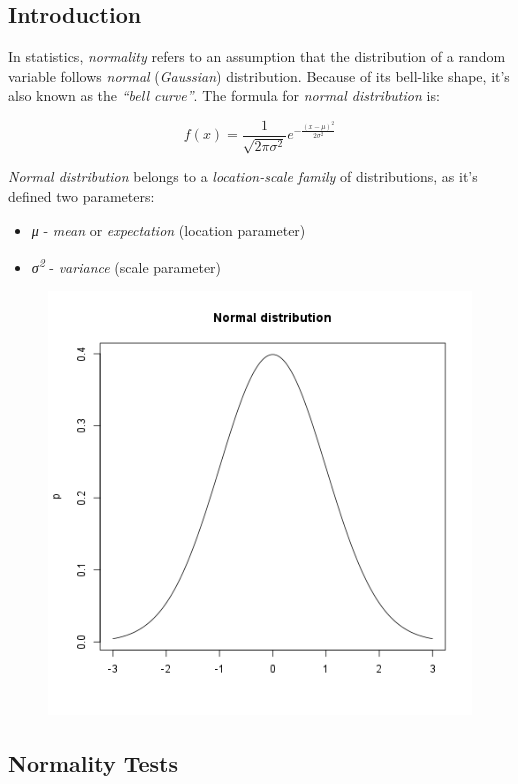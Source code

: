 \documentclass{article}
\makeatletter
\def\maxwidth{\ifdim\Gin@nat@width>\linewidth\linewidth
\else\Gin@nat@width\fi}
\let\Oldincludegraphics\includegraphics
\renewcommand{\includegraphics}[1]{\Oldincludegraphics[width=\maxwidth]{#1}}
\makeatother
\begin{document}
\subsection{Introduction}

In statistics, \emph{normality} refers to an assumption that the
distribution of a random variable follows \emph{normal}
(\emph{Gaussian}) distribution. Because of its bell-like shape, it's
also known as the \emph{``bell curve''}. The formula for \emph{normal
distribution} is:

\[f(x) = \frac{1}{\sqrt{2\pi{}\sigma{}^2}} e^{-\frac{(x-\mu{})^2}{2\sigma{}^2}}\]

\emph{Normal distribution} belongs to a \emph{location-scale family} of
distributions, as it's defined two parameters:

\begin{itemize}
\item
  \emph{μ} - \emph{mean} or \emph{expectation} (location parameter)
\item
  \emph{σ\textsuperscript{2}} - \emph{variance} (scale parameter)
\end{itemize}
\begin{figure}[htbp]
\centering
\includegraphics{2f8c434e103f36ec70966b372838d448.png}
\caption{}
\end{figure}

\subsection{Normality Tests}
\end{document}
